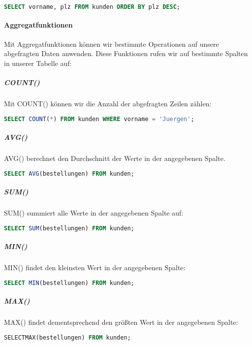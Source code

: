 \documentclass{article}
\begin{document}
	\begin{lstlisting}[language=SQL, caption=Vorname und PLZ aller Kunden absteigend sortiert anhand der PLZ]
	SELECT vorname, plz FROM kunden ORDER BY plz DESC;
	\end{lstlisting}

	\paragraph{Aggregatfunktionen}
	Mit Aggregatfunktionen können wir bestimmte Operationen auf unsere abgefragten Daten anwenden. Diese Funktionen rufen wir auf bestimmte Spalten in unserer Tabelle auf:

	\subparagraph{COUNT()}
	Mit COUNT() können wir die Anzahl der abgefragten Zeilen zählen:

	\begin{lstlisting}[language=SQL, caption=Anzahl aller Kunden mit dem Vornamen "Jürgen"]
	SELECT COUNT(*) FROM kunden WHERE vorname = 'Juergen';
	\end{lstlisting}

	\subparagraph{AVG()}
	AVG() berechnet den Durchschnitt der Werte in der angegebenen Spalte.

	\begin{lstlisting}[language=SQL, caption=Durchschnittliche Bestellungen eines Kunden]
	SELECT AVG(bestellungen) FROM kunden;
	\end{lstlisting}

	\subparagraph{SUM()}
	SUM() summiert alle Werte in der angegebenen Spalte auf:

	\begin{lstlisting}[language=SQL, caption=Anzahl der Bestellungen aller Kunden]
	SELECT SUM(bestellungen) FROM kunden;
	\end{lstlisting}

	\subparagraph{MIN()}
	MIN() findet den kleinsten Wert in der angegebenen Spalte:

	\begin{lstlisting}[language=SQL, caption=Kleinste Anzahl an Bestellungen eines Kunden]
	SELECT MIN(bestellungen) FROM kunden;
	\end{lstlisting}

	\subparagraph{MAX()}
	MAX() findet dementsprechend den größten Wert in der angegebenen Spalte:

	\begin{lstlisting}[language=SQL, caption=Einzelner Kunde mit den meisten Bestellungen]
	SELECTMAX(bestellungen) FROM kunden;
	\end{lstlisting}
\end{document}

